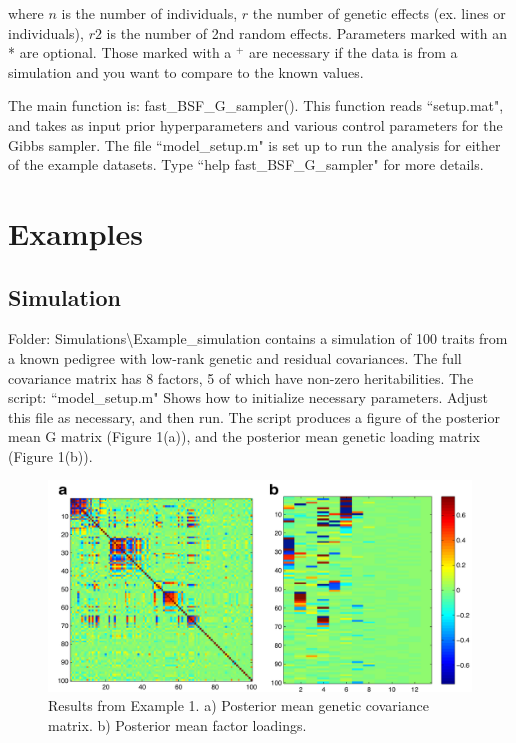 \documentclass[11pt]{amsart}
\begin{document}
\noindent where $n$ is the number of individuals, $r$ the number of genetic effects (ex. lines or individuals), $r2$ is the number of 2nd random effects. Parameters marked with an * are optional. Those marked with a $^+$ are necessary if the data is from a simulation and you want to compare to the known values.

The main function is: fast\_BSF\_G\_sampler(). This function reads ``setup.mat", and takes as input prior hyperparameters and various control parameters for the Gibbs sampler. The file ``model\_setup.m" is set up to run the analysis for either of the example datasets. Type ``help fast\_BSF\_G\_sampler" for more details. 

\section{Examples}
\subsection{Simulation}
Folder: Simulations\textbackslash Example\_simulation contains a simulation of 100 traits from a known pedigree with low-rank genetic and residual covariances. The full covariance matrix has 8 factors, 5 of which have non-zero heritabilities. The script: ``model\_setup.m" Shows how to initialize necessary parameters. Adjust this file as necessary, and then run. The script produces a figure of the posterior mean G matrix (Figure 1(a)), and the posterior mean genetic loading matrix (Figure 1(b)).
\begin{figure}[htbp]
\begin{center}
\includegraphics[width=6in]{Sim_Fig}
\caption{Results from Example 1. a) Posterior mean genetic covariance matrix. b) Posterior mean factor loadings.}
\label{default}
\end{center}
\end{figure}
\end{document}
